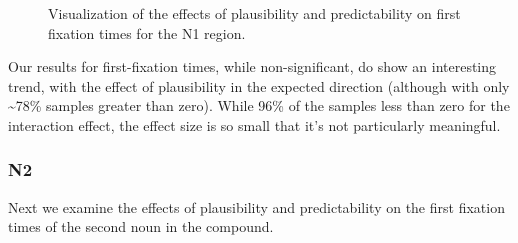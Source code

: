 \documentclass[
  letterpaper,
  DIV=11,
  numbers=noendperiod,
  nottoc,
  oneside]{scrreprt}
\begin{document}
\begin{figure}


\caption{\label{fig-firstfixn1}Visualization of the effects of
plausibility and predictability on first fixation times for the N1
region.}

\end{figure}%

Our results for first-fixation times, while non-significant, do show an
interesting trend, with the effect of plausibility in the expected
direction (although with only \textasciitilde78\% samples greater than
zero). While 96\% of the samples less than zero for the interaction
effect, the effect size is so small that it's not particularly
meaningful.

\subsubsection{N2}\label{n2}

Next we examine the effects of plausibility and predictability on the
first fixation times of the second noun in the compound.
\end{document}
